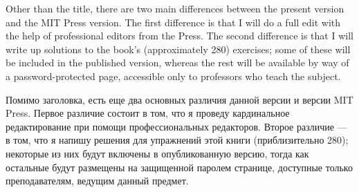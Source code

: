 \documentclass[CT4S-EN-RU]{subfiles}
\begin{document}
\begin{blockENG}
Other than the title, there are two main differences between the present version and the MIT Press version. The first difference is that I will do a full edit with the help of professional editors from the Press. The second difference is that I will write up solutions to the book's (approximately 280) exercises; some of these will be included in the published version, whereas the rest will be available by way of a password-protected page, accessible only to professors who teach the subject.
\end{blockENG}

\begin{blockRUS}
Помимо заголовка, есть еще два основных различия данной версии и версии MIT Press. Первое различие состоит в том, что я проведу кардинальное редактирование при помощи профессиональных редакторов. Второе различие — в том, что я напишу решения для упражнений этой книги (приблизительно 280); некоторые из них будут включены в опубликованную версию, тогда как остальные будут размещены на защищенной паролем странице, доступные только преподавателям, ведущим данный предмет. 
\end{blockRUS}
\end{document}
